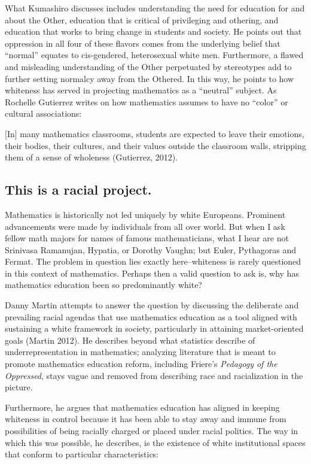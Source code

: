 What Kumashiro discusses includes understanding the need for education for and about the Other, education that is critical of privileging and othering, and education that works to bring change in students and society. He points out that oppression in all four of these flavors comes from the underlying belief that ``normal'' equates to cis-gendered, heterosexual white men. Furthermore, a flawed and misleading understanding of the Other perpetuated by stereotypes add to further setting normalcy away from the Othered. In this way, he points to how whiteness has served in projecting mathematics as a ``neutral'' subject. As Rochelle Gutierrez writes on how mathematics assumes to have no ``color'' or cultural associations:
\begin{displayquote}
  {[In]} many mathematics classrooms, students are expected to leave their emotions, their bodies, their cultures, and their values outside the classroom walls, stripping them of a sense of wholeness (Gutierrez, 2012).
\end{displayquote}

\subsection{This is a racial project.}
Mathematics is historically not led uniquely by white Europeans. Prominent advancements were made by individuals from all over world. But when I ask fellow math majors for names of famous mathematicians, what I hear are not Srinivasa Ramanujan, Hypatia, or Dorothy Vaughn; but Euler, Pythagoras and Fermat. The problem in question lies exactly here--whiteness is rarely questioned in this context of mathematics. Perhaps then a valid question to ask is, why has mathematics education been so predominantly white?

Danny Martin attempts to answer the question by discussing the deliberate and prevailing racial agendas that use mathematics education as a tool aligned with sustaining a white framework in society, particularly in attaining market-oriented goals (Martin 2012). He describes beyond what statistics describe of underrepresentation in mathematics; analyzing literature that is meant to promote mathematics education reform, including Friere's \textit{Pedagogy of the Oppressed}, stays vague and removed from describing race and racialization in the picture.

Furthermore, he argues that mathematics education has aligned in keeping whiteness in control because it has been able to stay away and immune from possibilities of being racially charged or placed under racial politics. The way in which this was possible, he describes, is the existence of white institutional spaces that conform to particular characteristics:

